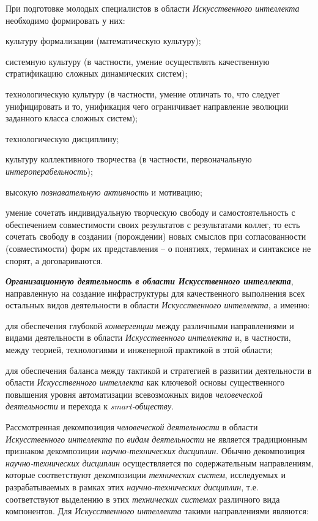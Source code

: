 \begin{textitemize}
	При подготовке молодых специалистов в области \textit{Искусственного интеллекта} необходимо формировать у них:
	\begin{textitemize}
		\item культуру формализации (математическую культуру);
		\item системную культуру (в частности, умение осуществлять качественную стратификацию сложных динамических систем);
		\item технологическую культуру (в частности, умение отличать то, что следует унифицировать и то, унификация чего ограничивает направление эволюции заданного класса сложных систем);
		\item технологическую дисциплину;
		\item культуру коллективного творчества (в частности, первоначальную \textit{интероперабельность});
		\item высокую \textit{познавательную активность} и мотивацию;
		\item умение сочетать индивидуальную творческую свободу и самостоятельность с обеспечением совместимости своих результатов с результатами коллег, то есть сочетать свободу в создании (порождении) новых смыслов при согласованности (совместимости) форм их представления -- о понятиях, терминах и синтаксисе не спорят, а договариваются.
	\end{textitemize}
	
	\item
	\textbf{\textit{Организационную деятельность в области Искусственного интеллекта}}, направленную на создание инфраструктуры для качественного выполнения всех остальных видов деятельности в области \textit{Искусственного интеллекта}, а именно:
	\begin{textitemize}
		\item
		для обеспечения глубокой \textit{конвергенции} между различными направлениями и видами деятельности в области \textit{Искусственного интеллекта} и, в частности, между теорией, технологиями и инженерной практикой в этой области;
		\item
		для обеспечения баланса между тактикой и стратегией в развитии деятельности в области \textit{Искусственного интеллекта} как ключевой основы существенного повышения уровня автоматизации всевозможных видов \textit{человеческой деятельности} и перехода к \textit{smart-обществу}.
	\end{textitemize}
\end{textitemize}

Рассмотренная декомпозиция \textit{человеческой} \textit{деятельности} в области \textit{Искусственного интеллекта} по \textit{видам} \textit{деятельности} не является традиционным признаком декомпозиции \textit{научно-технических дисциплин}. Обычно декомпозиция \textit{научно-технических дисциплин} осуществляется по содержательным направлениям, которые соответствуют декомпозиции \textit{технических систем}, исследуемых и разрабатываемых в рамках этих \textit{научно-технических дисциплин}, т.е. соответствуют выделению в этих \textit{технических системах} различного вида компонентов. Для \textit{Искусственного интеллекта} такими направлениями являются:

